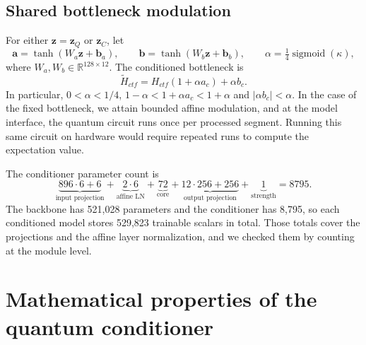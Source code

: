 \documentclass[10pt,a4paper]{article}
\newcommand{\R}{\mathbb{R}}
\begin{document}
\subsection{Shared bottleneck modulation}
For either $\mathbf z=\mathbf z_Q$ or $\mathbf z_C$, let
\begin{equation}
\mathbf a=\tanh(W_a\mathbf z+\mathbf b_a),\qquad
\mathbf b=\tanh(W_b\mathbf z+\mathbf b_b),\qquad
\alpha=\tfrac14\operatorname{sigmoid}(\kappa),
\end{equation}
where $W_a,W_b\in\R^{128\times12}$. The conditioned bottleneck is
\begin{equation}\label{eq:film}
\widetilde H_{ctf}=H_{ctf}(1+\alpha a_c)+\alpha b_c.
\end{equation}
In particular, $0<\alpha<1/4$, $1-\alpha<1+\alpha a_c<1+\alpha$ and $|\alpha b_c|<\alpha$. In the case of the fixed bottleneck, we attain bounded affine modulation, and at the model interface, the quantum circuit runs once per processed segment. Running this same circuit on hardware would require repeated runs to compute the expectation value.

The conditioner parameter count is
\begin{equation}\label{eq:params}
\underbrace{896\cdot6+6}_{\text{input projection}}+
\underbrace{2\cdot6}_{\text{affine LN}}+
\underbrace{72}_{\text{core}}+
\underbrace{12\cdot256+256}_{\text{output projection}}+
\underbrace{1}_{\text{strength}}=8795.
\end{equation}
The backbone has 521,028 parameters and the conditioner has 8,795, so each conditioned model stores 529,823 trainable scalars in total. Those totals cover the projections and the affine layer normalization, and we checked them by counting at the module level.

\section{Mathematical properties of the quantum conditioner}
\end{document}
